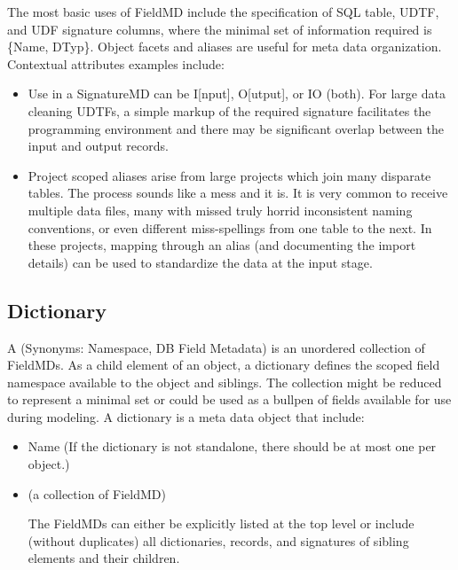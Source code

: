 \documentclass[10pt]{article}
\begin{document}
    The most basic uses of FieldMD include the specification of SQL table, UDTF, and UDF signature columns, where 
    the minimal set of information required is \{Name, DTyp\}. Object facets and aliases are useful for meta 
    data organization.   Contextual attributes examples include:
        \begin{itemize}[label=-,noitemsep,topsep=0pt]
            \item Use in a SignatureMD can be I[nput], O[utput], or IO (both).  For large data cleaning UDTFs,
                a simple markup of the required signature facilitates the programming environment and there
                may be significant overlap between the input and output records.
            \item Project scoped aliases arise from large projects which join many disparate tables.  The process
                sounds like a mess and it is.  It is very common to receive multiple data files, many with 
                missed truly horrid inconsistent naming conventions, or even different miss-spellings from one
                table to the next.   In these projects, mapping through an alias (and documenting the import details)
                can be used to standardize the data at the input stage.
        \end{itemize}




\subsection{Dictionary\label{dictionary}}

            A  (Synonyms: Namespace, DB Field Metadata)
            is an unordered collection of FieldMDs.  As a child element of an object,
            a dictionary defines the scoped field namespace available to the object and siblings.
            The collection might be reduced to represent a minimal set or 
            could be used as a bullpen of fields available for use during modeling.
            A dictionary is a meta data object that include:
                \begin{itemize}[label=-,noitemsep,topsep=0pt]
                    \item Name (If the dictionary is not standalone, there should be at most one per object.)
                    \item {} (a collection of FieldMD)\par
                        The FieldMDs can either be explicitly listed at the top level or 
                        include (without duplicates) all dictionaries, records, and signatures of sibling elements and
                        their children.
                \end{itemize}
\end{document}
